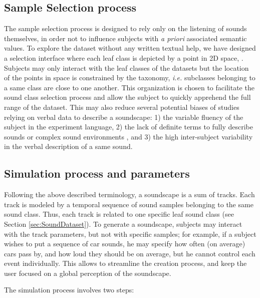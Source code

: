 \documentclass[twoside,twocolumn]{article}
\begin{document}
\subsection{Sample Selection process}

The sample selection process is designed to rely only on the listening of sounds themselves, in order not to influence subjects with \textit{a priori} associated semantic values. To explore the dataset without any written textual help, we have designed a selection interface where each leaf class is depicted by a point in 2D space,  \cite{lafayJAES}. Subjects may only interact with the leaf classes of the datasets but the location of the points in space is constrained by the taxonomy, \textit{i.e.} subclasses belonging to a same class are close to one another. This organization is chosen to facilitate the sound class selection process and allow the subject to quickly apprehend the full range of the dataset. This may also reduce several potential biases of studies relying on verbal data to describe a soundscape: 1) the variable fluency of the subject in the experiment language, 2) the lack of definite terms to fully describe sounds or complex sound environments \cite{guastavino_ideal_2006}, and 3) the high inter-subject variability in the verbal description of a same sound.


\subsection{Simulation process and parameters}
\label{sec:simulationProcess}

Following the above described terminology, a soundscape is a sum of tracks. Each track is modeled by a temporal sequence of sound samples belonging to the same sound class. Thus, each track is related to one specific leaf sound class (see Section \ref{sec:SoundDataset}). To generate a soundscape, subjects may interact with the track parameters, but not with specific samples; for example, if a subject wishes to put a sequence of car sounds, he may specify how often (on average) cars pass by, and how loud they should be on average, but he cannot control each event individually. This allows to streamline the creation process, and keep the user focused on a global perception of the soundscape.

The simulation process involves two steps: 
\end{document}
